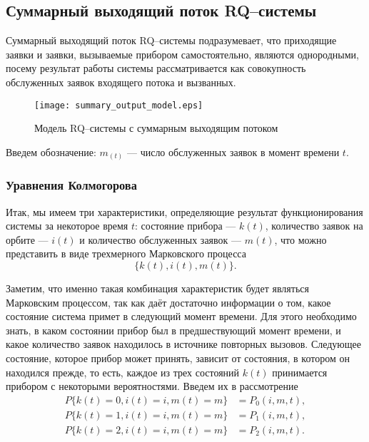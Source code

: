 \subsection{Суммарный выходящий поток RQ--системы} \label{section_simple_summary}
Суммарный выходящий поток RQ--системы подразумевает, что приходящие заявки и заявки, вызываемые прибором самостоятельно, являются однородными, посему результат работы системы рассматривается как совокупность обслуженных заявок входящего потока и вызванных. 
\begin{figure}[H]
	\centering
	\texttt{[image: summary\_output\_model.eps]}
	\caption{Модель RQ--системы с суммарным выходящим потоком}
	\label{summary_output_model_fig}
\end{figure}
Введем обозначение: $m_(t)$ --- число обслуженных заявок в момент времени $t$.


\subsubsection{Уравнения Колмогорова}
Итак, мы имеем три характеристики, определяющие результат функционирования системы за некоторое время $t$: состояние прибора --- $k(t)$, количество заявок на орбите --- $i(t)$ и количество обслуженных заявок --- $m(t)$, что можно представить в виде трехмерного Марковского процесса
\begin{equation*}
	\{k(t),i(t),m(t)\}.
\end{equation*}

Заметим, что именно такая комбинация характеристик будет являться Марковским процессом, так как даёт достаточно информации о том, какое состояние система примет в следующий момент времени. Для этого необходимо знать, в каком состоянии прибор был в предшествующий момент времени, и какое количество заявок находилось в источнике повторных вызовов.
Следующее состояние, которое прибор может принять, зависит от состояния, в котором он находился прежде, то есть, каждое из трех состояний $k(t)$ принимается прибором с некоторыми вероятностями. Введем их в рассмотрение
\begin{equation*}
	\begin{split}
		P\{k(t)=0,i(t)=i,m(t)=m\} &=P_{0}(i,m,t),\\
		P\{k(t)=1,i(t)=i,m(t)=m\} &=P_{1}(i,m,t),\\
		P\{k(t)=2,i(t)=i,m(t)=m\} &=P_{2}(i,m,t).
	\end{split}
\end{equation*}

